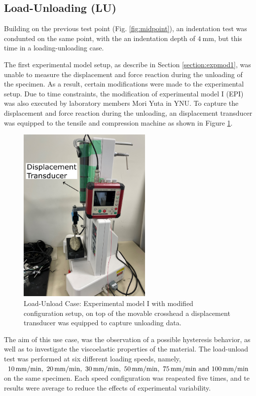 \subsection*{Load-Unloading (LU)}
\label{subsection:loadunload}
Building on the previous test point (Fig. \ref{fig:midpoint}), an indentation
 test was condunted on the same point, with the an indentation depth of 
 $\SI{4}{\milli \m}$, but this time in a loading-unloading case.

The first experimental model setup, as describe in Section \ref{section:expmod1},
was unable to measure the displacement and force reaction during the unloading 
of the specimen. As a result, certain modifications were made to the experimental 
setup. Due to time constraints, the modification of experimental model I (EPI)
was also executed by laboratory members Mori Yuta in YNU.
To capture the displacement and force reaction during the unloading, an 
displacement transducer was equipped to the tensile and compression machine 
as shown in Figure \ref{fig:unloadingexp1}.

\begin{figure}%
    \centering
   \quad
   \includegraphics[width=6.5cm]{Images/Experiment/unloading.png}%
   \caption{Load-Unload Case: Experimental model I with modified configuration setup, on top of the movable crosshead a displacement transducer was equipped to capture unloading data.}%
   \label{fig:unloadingexp1}%
\end{figure}
 
The aim of this use case, was the observation of a possible hysteresis
behavior, as well as to investigate the viscoelastic properties of the material.
The load-unload test was performed at six different loading speeds, namely, 
$\SIlist[per-mode = symbol]{10;20;30;50;75;100}{\milli \metre \per \minute}$ on the 
same specimen.
Each speed configuration was reapeated five times, and te results were average to 
reduce the effects of experimental variability.\\

